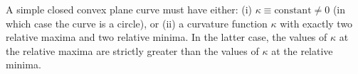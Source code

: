 A simple closed convex plane curve must have either:
(i) $\kappa \equiv \text{constant} \neq 0$ (in which case the curve is a circle), or
(ii) a curvature function $\kappa$ with exactly two relative maxima and two relative minima. In the latter case, the values of $\kappa$ at the relative maxima are strictly greater than the values of $\kappa$ at the relative minima.